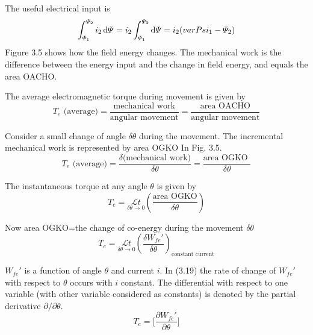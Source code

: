 \documentclass[a4paper,numbers=noenddot,12pt]{scrbook}
\begin{document}
The useful electrical input is 
\begin{equation}
    \int_{\varPsi_1}^{\varPsi_2} i_2 \dif \varPsi = i_2  \int_{\varPsi_1}^{\varPsi_2} \dif \varPsi =  i_2 (varPsi_1 -\varPsi_2)
    \label{eq:Eq3.15}
\end{equation}
Figure 3.5 shows how the field energy changes. The mechanical work is the difference between the energy input and the change in field energy, and equals the area OACHO.\@

The average electromagnetic torque during movement is given by 
\begin{equation}
    T_e \text{\ (average)} = \dfrac{\text{mechanical work}}{\text{angular movement}} = \dfrac{\text{area OACHO}}{\text{angular movement}}
    \label{eq:Eq3.16}
\end{equation}

Consider a small change of angle $\delta \theta$ during the movement. The incremental mechanical work is represented by area OGKO In Fig. 3.5.
\begin{equation}
    T_e \text{\ (average)}=\dfrac{\delta\text{(mechanical work)}}{\delta \theta} = \dfrac{\text{area OGKO }}{\delta\theta}
    \label{eq:Eq3.17}
\end{equation}

The instantaneous torque at any angle $\theta$ is given by
\begin{equation}
    T_e = \underset{\delta \theta \to 0}{\mathcal{L} t} \left(\dfrac{\text{area OGKO}}{\delta \theta}\right)
    \label{eq:Eq3.18}
\end{equation}

Now area OGKO=the change of co-energy during the movement $\delta \theta$
\begin{equation}
    T_e = \underset{\delta \theta \to 0}{\mathcal{L} t} {\left(\dfrac{\delta W_{fe}'}{\delta \theta}\right)}_{\text{constant current}}
    \label{eq:Eq3.19}
\end{equation}

$W_{fe}'$ is a function of angle $\theta$ and current $i$. In (3.19) the rate of change of $W_{fe}'$ with respect to $\theta$ occurs with $i$ constant. The differential with respect to one variable (with other variable considered as constants) is denoted by the partial derivative $\partial / \partial \theta$.
\begin{equation}
    T_e = \Big[ \dfrac{\partial W_{fe}'}{\partial \theta}\Big]
    \label{eq:Eq3.20}
\end{equation}
\end{document}

